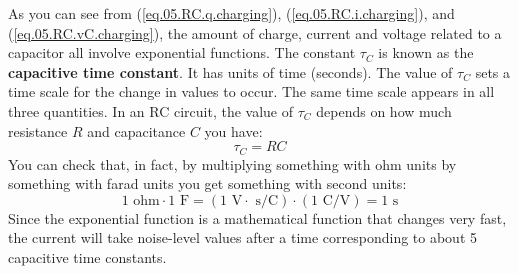 As you can see from (\ref{eq.05.RC.q.charging}), (\ref{eq.05.RC.i.charging}), and (\ref{eq.05.RC.vC.charging}), the amount of charge, current and voltage related to a capacitor all involve exponential functions. The constant $\tau_{C}$ is known as the \textbf{capacitive time constant}. It has units of time (seconds). The value of $\tau_{C}$ sets a time scale for the change in values to occur. The same time scale appears in all three quantities. In an RC circuit, the value of $\tau_{C}$ depends on how much resistance $R$ and capacitance $C$ you have:
\begin{equation}
    \tau_{C} = R C
    \label{eq.05.tauC}
\end{equation}
You can check that, in fact, by multiplying something with ohm units by something with farad units you get something with second units:
\begin{equation}
    1 \text{ ohm} \cdot 1 \text{ F} = \left(1 \text{ V}\cdot\text{ s/C}\right) \cdot \left(1 \text{ C/V}\right) = 1 \text{ s}
\end{equation}
Since the exponential function is a mathematical function that changes very fast, the current will take noise-level values after a time corresponding to about 5 capacitive time constants.

